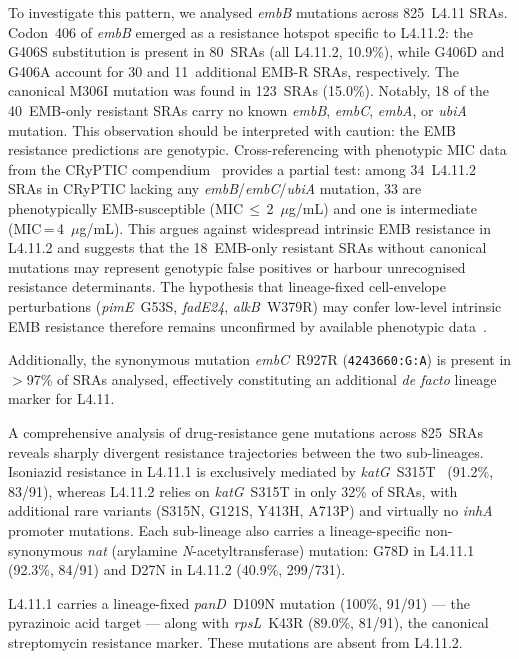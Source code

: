 \documentclass[11pt,a4paper]{article}
\newcommand{\spdi}[1]{\texttt{#1}}
\newcommand{\lignee}[1]{\textsf{#1}}
\begin{document}
To investigate this pattern, we analysed \textit{embB} mutations across
825~\lignee{L4.11} SRAs.  Codon~406
of \textit{embB} emerged as a resistance hotspot specific to
\lignee{L4.11.2}: the G406S substitution is present in 80~SRAs
(all \lignee{L4.11.2}, 10.9\%), while
G406D and G406A account for 30 and 11~additional EMB-R SRAs,
respectively.  The canonical M306I mutation was found in 123~SRAs
(15.0\%).  Notably, 18 of the 40~EMB-only resistant SRAs
carry no known \textit{embB}, \textit{embC}, \textit{embA}, or
\textit{ubiA} mutation.  This observation should be interpreted with
caution: the EMB resistance predictions are genotypic.
Cross-referencing with phenotypic MIC data from the CRyPTIC
compendium~\cite{cryptic2022} provides a partial test: among
34~\lignee{L4.11.2} SRAs in CRyPTIC lacking any
\textit{embB}/\textit{embC}/\textit{ubiA} mutation, 33 are
phenotypically EMB-susceptible (MIC\,$\leq$\,2~$\mu$g/mL) and one
is intermediate (MIC\,=\,4~$\mu$g/mL).  This argues against
widespread intrinsic EMB resistance in \lignee{L4.11.2} and suggests
that the 18~EMB-only resistant SRAs without canonical mutations
may represent genotypic false positives or harbour unrecognised
resistance determinants.  The hypothesis that lineage-fixed
cell-envelope perturbations (\textit{pimE}~G53S, \textit{fadE24},
\textit{alkB}~W379R) may confer low-level intrinsic EMB resistance
therefore remains unconfirmed by available phenotypic data~\cite{safi2019}.

Additionally, the synonymous mutation \textit{embC}~R927R
(\spdi{4243660:G:A}) is present in $>$97\% of SRAs analysed,
effectively constituting an additional \textit{de facto} lineage marker
for \lignee{L4.11}.

A comprehensive analysis of drug-resistance gene mutations across
825~SRAs reveals sharply divergent resistance trajectories between the
two sub-lineages.  Isoniazid resistance in \lignee{L4.11.1} is
exclusively mediated by \textit{katG}~S315T~\cite{vilcheze2014}
(91.2\%, 83/91), whereas
\lignee{L4.11.2} relies on \textit{katG}~S315T in only 32\% of SRAs,
with additional rare variants (S315N, G121S, Y413H, A713P) and virtually
no \textit{inhA} promoter mutations.  Each sub-lineage also carries
a lineage-specific non-synonymous \textit{nat} (arylamine
\textit{N}-acetyltransferase) mutation: G78D in \lignee{L4.11.1}
(92.3\%, 84/91) and D27N in \lignee{L4.11.2} (40.9\%, 299/731).

\lignee{L4.11.1} carries a lineage-fixed \textit{panD}~D109N mutation
(100\%, 91/91) ---
the pyrazinoic acid target --- along with \textit{rpsL}~K43R (89.0\%,
81/91), the canonical streptomycin resistance marker.  These mutations
are absent from \lignee{L4.11.2}.
\end{document}

